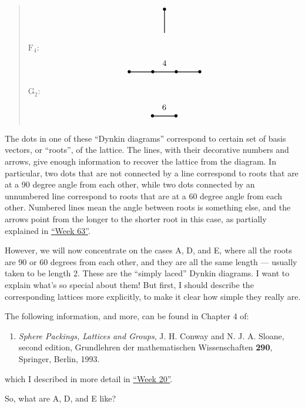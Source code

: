 \documentclass{article}
\def\tightlist{}
\begin{document}
\begin{quote}
\[\begin{gathered}
\begin{tikzpicture}
      \draw[thick] (2,0) to (2,1) node{$\bullet$};
    \end{tikzpicture}
  \end{gathered}
\] \(\mathrm{F}_4\): \[
  \begin{tikzpicture}
    \draw[thick] (0,0) node{$\bullet$} to (1,0) node{$\bullet$} to node[label=above:{4}]{} (2,0) node{$\bullet$} to (3,0) node {$\bullet$};
  \end{tikzpicture}
\] \(\mathrm{G}_2\): \[
  \begin{tikzpicture}
    \draw[thick] (0,0) node{$\bullet$} to node[label=above:{6}]{} (1,0) node{$\bullet$};
  \end{tikzpicture}
\]
\end{quote}

The dots in one of these ``Dynkin diagrams'' correspond to certain set
of basis vectors, or ``roots'', of the lattice. The lines, with their
decorative numbers and arrows, give enough information to recover the
lattice from the diagram. In particular, two dots that are not connected
by a line correspond to roots that are at a 90 degree angle from each
other, while two dots connected by an unnumbered line correspond to
roots that are at a 60 degree angle from each other. Numbered lines mean
the angle between roots is something else, and the arrows point from the
longer to the shorter root in this case, as partially explained in
\protect\hyperlink{week63}{``Week 63''}.

However, we will now concentrate on the cases A, D, and E, where all the
roots are 90 or 60 degrees from each other, and they are all the same
length --- usually taken to be length 2. These are the ``simply laced''
Dynkin diagrams. I want to explain what's so special about them! But
first, I should describe the corresponding lattices more explicitly, to
make it clear how simple they really are.

The following information, and more, can be found in Chapter 4 of:

\begin{enumerate}
\def\labelenumi{\arabic{enumi})}
\tightlist
\item
  \emph{Sphere Packings, Lattices and Groups}, J. H. Conway and N. J. A.
  Sloane, second edition, Grundlehren der mathematischen Wissenschaften
  \textbf{290}, Springer, Berlin, 1993.
\end{enumerate}

which I described in more detail in \protect\hyperlink{week20}{``Week
20''}.

So, what are A, D, and E like?
\end{document}
